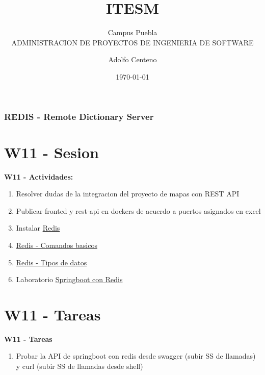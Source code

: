 \documentclass{beamer}
\begin{document}
\title{ITESM}  
\subtitle{Campus Puebla\\ADMINISTRACION DE PROYECTOS DE INGENIERIA DE SOFTWARE
}
\author{Adolfo Centeno}
\date{\today} 


\begin{frame}
\titlepage
\end{frame}

\begin{frame}\frametitle{REDIS - Remote Dictionary Server}
\tableofcontents
\end{frame} 


\section{W11 - Sesion }

\begin{frame}

    
\textbf{W11 - Actividades:}


\begin{enumerate}

\item
    Resolver dudas de la integracion del proyecto de mapas con REST API
\item
    Publicar fronted y rest-api en dockers de acuerdo a puertos asignados en excel
\item
   Instalar   
    \href{https://redis.io/topics/quickstart}{Redis}
    
\item
    \href{https://codeburst.io/redis-what-and-why-d52b6829813}{Redis - Comandos basicos}
\item
    \href{https://redis.io/topics/data-types-intro}{Redis - Tipos de datos}
    
\item
   Laboratorio   
    \href{https://medium.com/@kumarshivam_66534/implementation-of-spring-boot-data-redis-for-caching-in-my-application-218d02c31191}{Springboot con Redis}
	 
\end{enumerate}

	


\end{frame}


\section{W11  - Tareas }

\begin{frame}


\textbf{W11  - Tareas}


\begin{enumerate}

\item
	Probar la API de springboot con redis desde swagger (subir SS de llamadas) y curl (subir SS de llamadas desde shell)
	
\end{enumerate} 


\end{frame}
\end{document}
